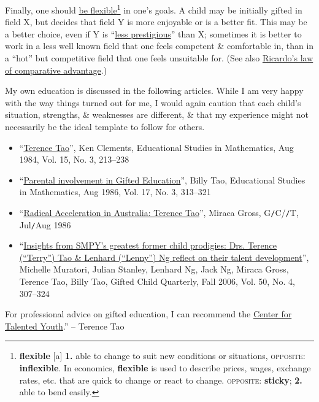\documentclass{article}
\numberwithin{equation}{section}
\begin{document}
Finally, one should \href{https://terrytao.wordpress.com/career-advice/be-flexible/}{be flexible\footnote{\textbf{flexible} [a] \textbf{1.} able to change to suit new conditions or situations, \textsc{opposite}: \textbf{inflexible}. In economics, \textbf{flexible} is used to describe prices, wages, exchange rates, etc. that are quick to change or react to change. \textsc{opposite}: \textbf{sticky}; \textbf{2.} able to bend easily.}} in one's goals. A child may be initially gifted in field X, but decides that field Y is more enjoyable or is a better fit. This may be a better choice, even if Y is ``\href{https://terrytao.wordpress.com/career-advice/don%E2%80%99t-base-career-decisions-on-glamour-or-fame/}{less prestigious}'' than X; sometimes it is better to work in a less well known field that one feels competent \& comfortable in, than in a ``hot'' but competitive field that one feels unsuitable for. (See also \href{http://en.wikipedia.org/wiki/Comparative_advantage}{Ricardo's law of comparative advantage}.)

My own education is discussed in the following articles. While I am very happy with the way things turned out for me, I would again caution that each child's situation, strengths, \& weaknesses are different, \& that my experience might not necessarily be the ideal template to follow for others.
\begin{itemize}
	\item ``\href{https://link.springer.com/article/10.1007/BF00312075}{Terence Tao}'', Ken Clements, Educational Studies in Mathematics, Aug 1984, Vol. 15, No. 3, 213--238
	\item ``\href{https://www.jstor.org/stable/3482231}{Parental involvement in Gifted Education}'', Billy Tao, Educational Studies in Mathematics, Aug 1986, Vol. 17, No. 3, 313--321
	\item ``\href{https://journals.sagepub.com/doi/10.1177/107621758600900402}{Radical Acceleration in Australia: Terence Tao}'', Miraca Gross, G\texttt{/}C/\texttt{/}T, Jul\texttt{/}Aug 1986
	\item ``\href{http://gcq.sagepub.com/cgi/content/abstract/50/4/307}{Insights from SMPY's greatest former child prodigies: Drs. Terence (``Terry'') Tao \& Lenhard (``Lenny'') Ng reflect on their talent development}'', Michelle Muratori, Julian Stanley, Lenhard Ng, Jack Ng, Miraca Gross, Terence Tao, Billy Tao, Gifted Child Quarterly, Fall 2006, Vol. 50, No. 4, 307--324
\end{itemize}
For professional advice on gifted education, I can recommend the \href{http://cty.jhu.edu/}{Center for Talented Youth}.'' -- Terence Tao
\end{document}
